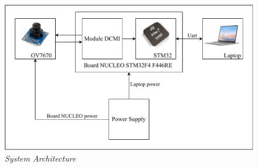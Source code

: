 \documentclass[D:/Latex/Internship/Report/Latex/Report.tex]{subfiles}
\begin{document}
\begin{otherlanguage}{english}
				\begin{figure}[ht!]
					\label{fig:SystemArchi}
					\centering
					\small
					\includegraphics[scale = 0.78]{design_descriptionnew.pdf}
					\caption{\it System Architecture}
				\end{figure}
	\end{otherlanguage}
\end{document}
